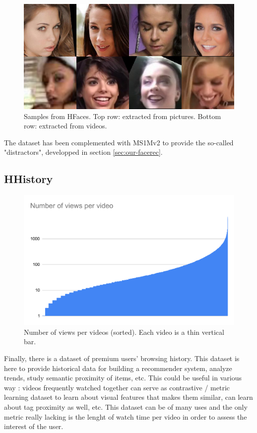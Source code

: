 \begin{figure}
    \centering
    \includegraphics[scale=1.5]{20-files/xfaces-samples.jpg}
    \caption{Samples from HFaces. Top row: extracted from pictures. Bottom row: extracted from videos.}
    \label{fig:xfaces-samples}
\end{figure}

The dataset has been complemented with MS1Mv2 \citep{celeb1m} to provide the so-called "distractors", developped in section \ref{sec:our-facerec}.

\subsection{HHistory}
\label{sec:hhistory}
\begin{figure}
    \centering
    \includegraphics[width=\columnwidth]{20-files/video_views.pdf}
    \caption{Number of views per videos (sorted). Each video is a thin vertical bar.}
    \label{fig:xhistory-views}
\end{figure}

Finally, there is a dataset of premium users' browsing history. This dataset is here to provide historical data for building a recommender system, analyze trends, study semantic proximity of items, etc. This could be useful in various way : videos frequently watched together can serve as contrastive / metric learning dataset to learn about visual features that makes them similar, can learn about tag proximity as well, etc. This dataset can be of many uses and the only metric really lacking is the lenght of watch time per video in order to assess the interest of the user.


